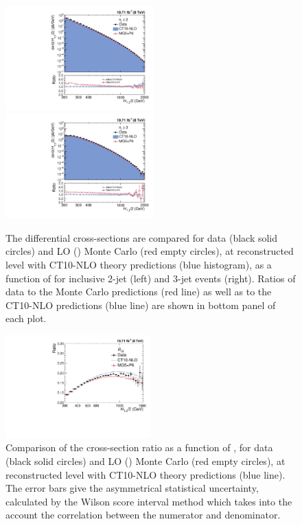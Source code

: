 \begin{figure}[!htbp]
 \begin{center}
 \hspace*{-5mm}\includegraphics[width=0.51\textwidth]{Plots_HT_2_150/Comparison_all_2_HT_2_150.pdf}%
 ~~\includegraphics[width=0.51\textwidth]{Plots_HT_2_150/Comparison_all_3_HT_2_150.pdf}
 \caption{The differential cross-sections are compared for data (black solid circles) and LO \MadGraphFn\plusn \PYTHIAS (\MGP) Monte Carlo (red empty circles), at reconstructed level with CT10-NLO theory predictions (blue histogram), as a function of \httwo for inclusive 2-jet (left) and 3-jet events (right). Ratios of data to the Monte Carlo predictions (red line) as well as to the CT10-NLO predictions (blue line) are shown in bottom panel of each plot.}
 \label{fig:comp_all}
 \end{center}
\end{figure}

\begin{figure}[!h] 
 \begin{center}
 \hspace*{-5mm}\includegraphics[width=0.5\textwidth]{Plots_HT_2_150/Ratio_32_all_HT_2_150.pdf}
 \caption{Comparison of the cross-section ratio \ratio as a function of \httwons, for data (black solid circles) and LO \MadGraphFn\plusn \PYTHIAS (\MGP) Monte Carlo (red empty circles), at reconstructed level with CT10-NLO theory predictions (blue line). The error bars give the asymmetrical statistical uncertainty, calculated by the Wilson score interval method which takes into the account the correlation between the numerator and denominator.}
 \label{fig:ratio_32}
 \end{center}
\end{figure}

